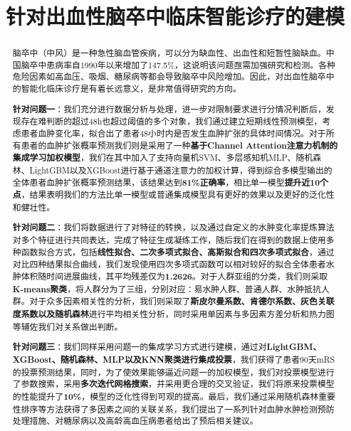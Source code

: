 \documentclass[bwprint]{gmcmthesis}
\title{针对出血性脑卒中临床智能诊疗的建模}
\begin{document}
	\maketitle
	
	\begin{abstract}
		脑卒中（中风）是一种急性脑血管疾病，可以分为缺血性、出血性和短暂性脑缺血。中国脑卒中患病率自1990年以来增加了147.5\%，这说明该问题亟需加强研究和检测。各种危险因素如高血压、吸烟、糖尿病等都会导致脑卒中风险增加。因此，对出血性脑卒中的智能化临床诊疗是有着长远意义，是非常值得研究的方向。
		
		\textbf{针对问题一}：我们充分进行数据分析与处理，进一步对限制要求进行分情况判断后，发现存在难判断的超过48h也超过阈值的多个对象，我们通过建立短期线性预测模型，考虑患者血肿变化率，拟合出了患者48小时内是否发生血肿扩张的具体时间情况。对于所有患者的血肿扩张概率预测我们则是采用了一种\textbf{基于Channel Attention注意力机制的集成学习加权模型}，我们在其中加入了支持向量机SVM、多层感知机MLP、随机森林、LightGBM以及XGBoost进行基于通道注意力的加权计算，得到综合多模型输出的全体患者血肿扩张概率预测结果，该结果达到\textbf{81\%正确率}，相比单一模型\textbf{提升近10个点}，结果表明我们的方法比单一模型或普通集成模型具有更好的效果以及更好的泛化性和健壮性。
		
		\textbf{针对问题二}：我们将数据进行了对特征的转换，以及通过自定义的水肿变化率提炼算法对多个特征进行共同表达，完成了特征生成凝练工作，随后我们在得到的数据上使用多种函数拟合方式，包括\textbf{线性拟合、二次多项式拟合、高斯拟合和四次多项式拟合}，通过对比四种结果拟合曲线，我们发现使用四次多项式函数可以相对较好的拟合全体患者水肿体积随时间进展曲线，其平均残差仅为\textbf{1.2626}。对于人群亚组的分类，我们则采取\textbf{K-means聚类}，将人群分为了三组，分别对应：易水肿人群、普通人群、水肿抵抗人群。对于众多因素相关性的分析，我们则采取了\textbf{斯皮尔曼系数、肯德尔系数、灰色关联度系数以及随机森林}进行平均相关性分析，同时采用单因素与多因素方差分析和热力图等辅佐我们对关系做出判断。
		
		
		\textbf{针对问题三}：我们同样采用问题一的集成学习方式进行建模，通过对\textbf{LightGBM、XGBoost、随机森林、MLP以及KNN聚类进行集成投票}，我们获得了患者90天mRS的投票预测结果，同时，为了使效果能够逼近问题一的加权模型，我们对投票模型进行了参数搜索，采用\textbf{多次迭代网格搜索}，并采用更合理的交叉验证，我们将原来投票模型的性能提升了\textbf{10\%}，模型的泛化性得到可观的提高。最后，我们通过采用随机森林重要性排序等方法获得了多因素之间的关联关系，我们提出了一系列针对血肿水肿检测预防处理措施、对糖尿病以及高龄高血压病患者给出了预后相关建议。
	
	
	
	\end{abstract}
	
\end{document}
